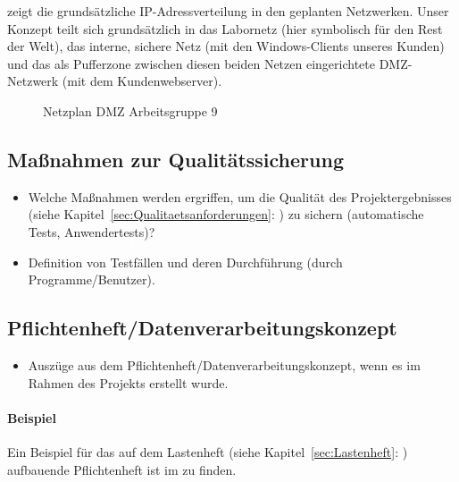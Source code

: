  zeigt die grundsätzliche IP-Adressverteilung in den geplanten Netzwerken. 
Unser Konzept teilt sich grundsätzlich in das Labornetz (hier symbolisch für den Rest der Welt), das interne, sichere Netz (mit den Windows-Clients unseres Kunden) und das als Pufferzone zwischen diesen beiden Netzen eingerichtete \ac{DMZ}-Netzwerk (mit dem Kundenwebserver).
\begin{figure}[htb]
\centering
{}
\caption{Netzplan DMZ Arbeitsgruppe 9}
\label{fig:Netzplan}
\end{figure}


\subsection{Maßnahmen zur Qualitätssicherung}
\label{sec:Qualitaetssicherung}
\begin{itemize}
	\item Welche Maßnahmen werden ergriffen, um die Qualität des Projektergebnisses (siehe Kapitel~\ref{sec:Qualitaetsanforderungen}: ) zu sichern (\zB automatische Tests, Anwendertests)?
	\item \Ggfs Definition von Testfällen und deren Durchführung (durch Programme/Benutzer).
\end{itemize}


\subsection{Pflichtenheft/Datenverarbeitungskonzept}
\label{sec:Pflichtenheft}
\begin{itemize}
	\item Auszüge aus dem Pflichtenheft/Datenverarbeitungskonzept, wenn es im Rahmen des Projekts erstellt wurde.
\end{itemize}

\paragraph{Beispiel}
Ein Beispiel für das auf dem Lastenheft (siehe Kapitel~\ref{sec:Lastenheft}: ) aufbauende Pflichtenheft ist im  zu finden.


